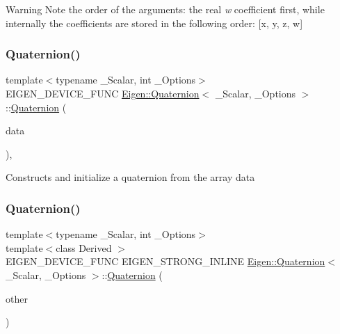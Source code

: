 \begin{DoxyWarning}{Warning}
Note the order of the arguments\+: the real {\itshape w} coefficient first, while internally the coefficients are stored in the following order\+: \mbox{[}{\ttfamily x}, {\ttfamily y}, {\ttfamily z}, {\ttfamily w}\mbox{]} 
\end{DoxyWarning}
\mbox{\label{class_eigen_1_1_quaternion_abb9e33e5d10806b5bc8b0683e94e8f72}} 
\subsubsection{\texorpdfstring{Quaternion()}{Quaternion()}\hspace{0.1cm}{\footnotesize\ttfamily [3/7]}}
{\footnotesize\ttfamily template$<$typename \+\_\+\+Scalar, int \+\_\+\+Options$>$ \\
E\+I\+G\+E\+N\+\_\+\+D\+E\+V\+I\+C\+E\+\_\+\+F\+U\+NC \mbox{\hyperlink{class_eigen_1_1_quaternion}{Eigen\+::\+Quaternion}}$<$ \+\_\+\+Scalar, \+\_\+\+Options $>$\+::\mbox{\hyperlink{class_eigen_1_1_quaternion}{Quaternion}} (\begin{DoxyParamCaption}\item[{const Scalar $\ast$}]{data }\end{DoxyParamCaption})\hspace{0.3cm}{\ttfamily [inline]}, {\ttfamily [explicit]}}

Constructs and initialize a quaternion from the array data \mbox{\label{class_eigen_1_1_quaternion_a272ce2dc4e30e6e0d68f455c7b1cc407}} 
\subsubsection{\texorpdfstring{Quaternion()}{Quaternion()}\hspace{0.1cm}{\footnotesize\ttfamily [4/7]}}
{\footnotesize\ttfamily template$<$typename \+\_\+\+Scalar, int \+\_\+\+Options$>$ \\
template$<$class Derived $>$ \\
E\+I\+G\+E\+N\+\_\+\+D\+E\+V\+I\+C\+E\+\_\+\+F\+U\+NC E\+I\+G\+E\+N\+\_\+\+S\+T\+R\+O\+N\+G\+\_\+\+I\+N\+L\+I\+NE \mbox{\hyperlink{class_eigen_1_1_quaternion}{Eigen\+::\+Quaternion}}$<$ \+\_\+\+Scalar, \+\_\+\+Options $>$\+::\mbox{\hyperlink{class_eigen_1_1_quaternion}{Quaternion}} (\begin{DoxyParamCaption}\item[{const \mbox{\hyperlink{class_eigen_1_1_quaternion_base}{Quaternion\+Base}}$<$ Derived $>$ \&}]{other }\end{DoxyParamCaption})\hspace{0.3cm}{\ttfamily [inline]}}

